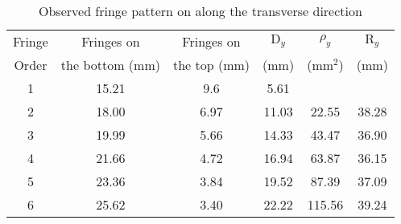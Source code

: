 \begin{table}[H]
    \centering
    \begin{tabular}{|c|c|c|c|c|c|}
        \hline
        Fringe    & Fringes on     & Fringes on       & $\text{D}_y$        & $\rho_y$   & $\text{R}_y$    \\ 
        Order     & the bottom (mm)  & the top (mm)   & (mm)       & ($\text{mm}^2$)   & (mm)   \\ \hline
        1 & 15.21 & 9.6  &  5.61 &     &     \\
        2 & 18.00 & 6.97 & 11.03 &  22.55 & 38.28 \\
        3 & 19.99 & 5.66 & 14.33 &  43.47 & 36.90 \\
        4 & 21.66 & 4.72 & 16.94 &  63.87 & 36.15 \\
        5 & 23.36 & 3.84 & 19.52 &  87.39 & 37.09 \\
        6 & 25.62 & 3.40 & 22.22 & 115.56 & 39.24 \\
        \hline
       \end{tabular}
    \caption{Observed fringe pattern on along the transverse direction}
    \label{tab:2}
\end{table}